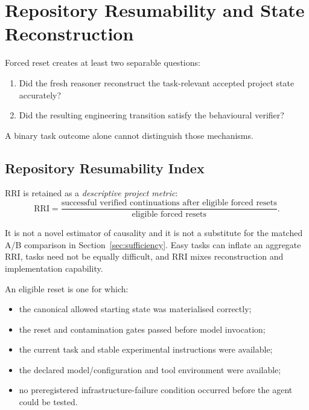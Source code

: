 \section{Repository Resumability and State Reconstruction}
\label{sec:resumability}

Forced reset creates at least two separable questions:

\begin{enumerate}
    \item Did the fresh reasoner reconstruct the task-relevant accepted project state accurately?
    \item Did the resulting engineering transition satisfy the behavioural verifier?
\end{enumerate}

A binary task outcome alone cannot distinguish those mechanisms.

\subsection{Repository Resumability Index}

RRI is retained as a \emph{descriptive project metric}:
\begin{equation}
\mathrm{RRI}
=
\frac{\text{successful verified continuations after eligible forced resets}}
{\text{eligible forced resets}}.
\label{eq:rri}
\end{equation}

It is not a novel estimator of causality and it is not a substitute for the matched A/B comparison in Section~\ref{sec:sufficiency}. Easy tasks can inflate an aggregate RRI, tasks need not be equally difficult, and RRI mixes reconstruction and implementation capability.

An eligible reset is one for which:
\begin{itemize}
    \item the canonical allowed starting state was materialised correctly;
    \item the reset and contamination gates passed before model invocation;
    \item the current task and stable experimental instructions were available;
    \item the declared model/configuration and tool environment were available;
    \item no preregistered infrastructure-failure condition occurred before the agent could be tested.
\end{itemize}

